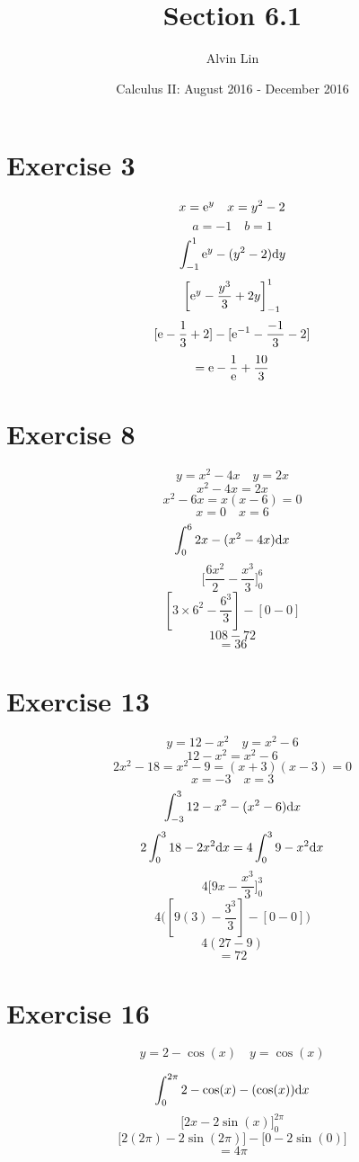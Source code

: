 \documentclass[letterpaper, 12pt]{math}
\title{Section 6.1}
\author{Alvin Lin}
\date{Calculus II: August 2016 - December 2016}
\begin{document}
\maketitle

\section*{Exercise 3}
\[ x = \mathrm{e}^{y} \quad x = y^{2}-2 \]
\[ a = -1 \quad b = 1 \]
\[ \int_{-1}^{1}{\mathrm{e}^{y}-(y^{2}-2)\mathrm{d}{y}} \]
\[ \bigg[\mathrm{e}^{y}-\frac{y^{3}}{3}+2y\bigg]_{-1}^{1} \]
\[ [\mathrm{e}-\frac{1}{3}+2]-[\mathrm{e}^{-1}-\frac{-1}{3}-2] \]
\[ = \mathrm{e}-\frac{1}{\mathrm{e}}+\frac{10}{3} \]

\section*{Exercise 8}
\[ y = x^{2}-4x \quad y = 2x \]
\[ x^{2}-4x = 2x \]
\[ x^{2}-6x = x(x-6) = 0 \]
\[ x = 0 \quad x = 6 \]
\[ \int_{0}^{6}{2x-(x^{2}-4x)\mathrm{d}{x}} \]
\[ \bigg[\frac{6x^{2}}{2}-\frac{x^{3}}{3}\bigg]_{0}^{6} \]
\[ [3\times6^{2}-\frac{6^{3}}{3}]-[0-0] \]
\[ 108-72 \]
\[ = 36 \]

\section*{Exercise 13}
\[ y = 12-x^{2} \quad y = x^{2}-6 \]
\[ 12-x^{2} = x^{2}-6 \]
\[ 2x^{2}-18 = x^{2}-9 = (x+3)(x-3) = 0 \]
\[ x = -3 \quad x = 3 \]
\[ \int_{-3}^{3}{12-x^{2}-(x^{2}-6)\mathrm{d}{x}} \]
\[ 2\int_{0}^{3}{18-2x^{2}\mathrm{d}{x}} = 4\int_{0}^{3}{9-x^{2}\mathrm{d}{x}} \]
\[ 4\bigg[9x-\frac{x^{3}}{3}\bigg]_{0}^{3} \]
\[ 4\bigg([9(3)-\frac{3^{3}}{3}]-[0-0]\bigg) \]
\[ 4(27-9) \]
\[ = 72 \]

\section*{Exercise 16}
\[ y = 2-\cos(x) \quad y = \cos(x) \]
\begin{center}
\end{center}
\[ \int_{0}^{2\pi}{2-\cos(x)-(\cos(x))\mathrm{d}{x}} \]
\[ \bigg[2x-2\sin(x)\bigg]_{0}^{2\pi} \]
\[ \bigg[2(2\pi)-2\sin(2\pi)\bigg]-\bigg[0-2\sin(0)\bigg] \]
\[ = 4\pi \]
\end{document}
